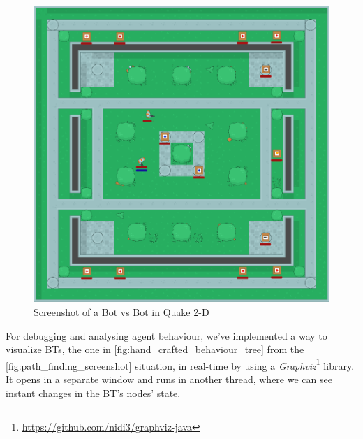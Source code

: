 \documentclass[a4paper, twocolumn]{article}
\begin{document}
        \begin{figure}[H]
            \centering
            \includegraphics[width=\linewidth]{share/screenshot.png}
            \caption{Screenshot of a Bot vs Bot in Quake 2-D}
            \label{fig:behaviour_tree_screenshot}
        \end{figure}

        For debugging and analysing agent behaviour, we've implemented a way to visualize BTs, the one in \cref{fig:hand_crafted_behaviour_tree} from the \cref{fig:path_finding_screenshot} situation, in real-time by using a \emph{Graphviz}\footnote{\url{https://github.com/nidi3/graphviz-java}} library. It opens in a separate window and runs in another thread, where we can see instant changes in the BT's nodes' state.
\end{document}
